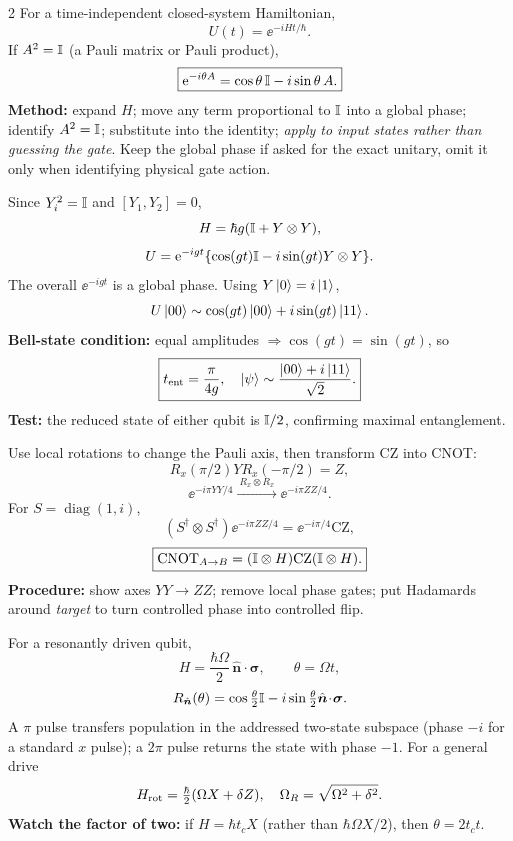 \begin{multicols}{2}
For a time-independent closed-system Hamiltonian,
\[U(t)=\ee^{-iHt/\hbar}.\]
If $A^2=\mathbb I$ (a Pauli matrix or Pauli product),
\[\boxed{\mathrm e^{-i\theta A}=\cos\theta\,\mathbb I-i\sin\theta\,A.}\]
\textbf{Method:} expand $H$; move any term proportional to $\mathbb I$ into a global phase; identify $A^2=\mathbb I$; substitute into the identity; \emph{apply to input states rather than guessing the gate}. Keep the global phase if asked for the exact unitary, omit it only when identifying physical gate action.

Since $Y_i^2=\mathbb I$ and $[Y_1,Y_2]=0$,
\[H=\hbar g(\mathbb I+Y\otimes Y),\]
\[U=\mathrm e^{-igt}\{\cos(gt)\mathbb I-i\sin(gt)Y\otimes Y\}.\]
The overall $\ee^{-igt}$ is a global phase. Using $Y\left\lvert 0\right\rangle=i\left\lvert 1\right\rangle$,
\[U\left\lvert 00\right\rangle\sim\cos(gt)\left\lvert 00\right\rangle+i\sin(gt)\left\lvert 11\right\rangle.\]
\textbf{Bell-state condition:} equal amplitudes $\Rightarrow\cos(gt)=\sin(gt)$, so
\[\boxed{t_{\rm ent}=\frac{\pi}{4g},\quad \left\lvert \psi\right\rangle\sim\frac{\left\lvert 00\right\rangle+i\left\lvert 11\right\rangle}{\sqrt2}.}\]
\textbf{Test:} the reduced state of either qubit is $\mathbb I/2$, confirming maximal entanglement.

Use local rotations to change the Pauli axis, then transform CZ into CNOT:
\[R_x(\pi/2)Y R_x(-\pi/2)=Z,\]
\[\ee^{-i\pi YY/4}\xrightarrow{\ R_x\otimes R_x\ }\ee^{-i\pi ZZ/4}.\]
For $S=\operatorname{diag}(1,i)$,
\[(S^\dagger\!\otimes S^\dagger)\ee^{-i\pi ZZ/4}=\ee^{-i\pi/4}\mathrm{CZ},\]
\[\boxed{\mathrm{CNOT}_{A\to B}=(\mathbb I\otimes H)\mathrm{CZ}(\mathbb I\otimes H).}\]
\textbf{Procedure:} show axes $YY\to ZZ$; remove local phase gates; put Hadamards around \emph{target} to turn controlled phase into controlled flip.

\columnbreak
{}
For a resonantly driven qubit,
\[H=\frac{\hbar\Omega}{2}\,\hat{\bm n}\!\cdot\!\bm\sigma,\qquad \theta=\Omega t,\]
\[R_{\hat{\bm n}}(\theta)=\cos\tfrac\theta2\mathbb I-i\sin\tfrac\theta2\hat{\bm n}\!\cdot\!\bm\sigma.\]
A $\pi$ pulse transfers population in the addressed two-state subspace (phase $-i$ for a standard $x$ pulse); a $2\pi$ pulse returns the state with phase $-1$. For a general drive
\[H_{\rm rot}=\tfrac{\hbar}{2}(\Omega X+\delta Z),\quad \Omega_R=\sqrt{\Omega^2+\delta^2}.\]
\textbf{Watch the factor of two:} if $H=\hbar t_c X$ (rather than $\hbar\Omega X/2$), then $\theta=2t_ct$.


\end{multicols}

